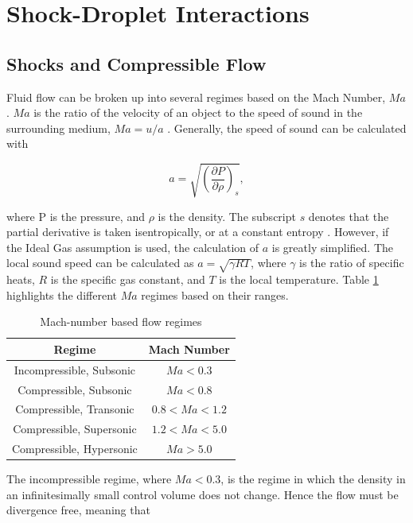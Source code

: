 \documentclass{UCF_ETD}
\begin{document}
\section{Shock-Droplet Interactions}
\label{sec:shockDropBackground}

\subsection{Shocks and Compressible Flow}

Fluid flow can be broken up into several regimes based on the Mach Number, $Ma$. $Ma$ is the ratio of the velocity of an object to the speed of sound in the surrounding medium, $Ma = u/a$ \cite{GasDynamics}. Generally, the speed of sound can be calculated with

\begin{equation}
    a = \sqrt{\left(\frac{\partial P}{\partial \rho}\right)_{s}},
    \label{eq:sound_speed}
\end{equation}

where P is the pressure, and $\rho$ is the density. The subscript $s$ denotes that the partial derivative is taken isentropically, or at a constant entropy \cite{GasDynamics}. However, if the Ideal Gas assumption is used, the calculation of $a$ is greatly simplified. The local sound speed can be calculated as $a = \sqrt{\gamma R T}$, where $\gamma$ is the ratio of specific heats, $R$ is the specific gas constant, and $T$ is the local temperature. Table \ref{tab:mach_regimes} highlights the different $Ma$ regimes based on their ranges. 

\begin{table}[htp!]
    \centering
    \caption{Mach-number based flow regimes}
    \begin{tabular}{c|c}
       Regime  & Mach Number\\
       \hline
        Incompressible, Subsonic & $Ma < 0.3$ \\
        Compressible, Subsonic &  $Ma < 0.8 $\\
        Compressible, Transonic & $ 0.8 < Ma < 1.2$\\
        Compressible, Supersonic & $1.2 < Ma < 5.0$\\
        Compressible, Hypersonic & $ Ma > 5.0$
    \end{tabular}
    \label{tab:mach_regimes}
\end{table}

The incompressible regime, where $Ma < 0.3$, is the regime in which the density in an infinitesimally small control volume does not change. Hence the flow must be divergence free, meaning that
\end{document}
